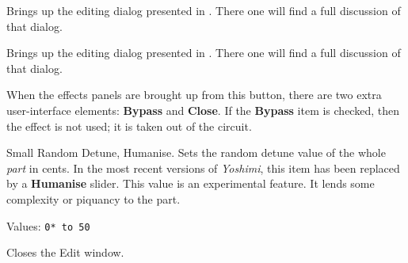    Brings up the editing dialog presented in
   .
   There one will find a full discussion of that dialog.

   Brings up the editing dialog presented in
   .
   There one will find a full discussion of that dialog.

   When the effects panels are brought up from this button, there are two extra
   user-interface elements:
   \textbf{Bypass} and \textbf{Close}.
   If the \textbf{Bypass} item is checked, then the effect is not
   used; it is taken out of the circuit.

   Small Random Detune, Humanise.
   Sets the random detune value of the whole \textsl{part} in
   cents.
   In the most recent versions of \textsl{Yoshimi}, this
   item has been replaced by a \textbf{Humanise} slider.
   This value is an experimental feature.  It lends some complexity or
   piquancy to the part.

   Values: \texttt{0* to 50}

   Closes the Edit window.

